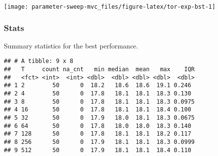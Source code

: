 \documentclass[]{book}
\newenvironment{Shaded}{\begin{snugshade}}{\end{snugshade}}
\newcommand{\DataTypeTok}[1]{\textcolor[rgb]{0.13,0.29,0.53}{#1}}
\newcommand{\KeywordTok}[1]{\textcolor[rgb]{0.13,0.29,0.53}{\textbf{#1}}}
\newcommand{\NormalTok}[1]{#1}
\newcommand{\OperatorTok}[1]{\textcolor[rgb]{0.81,0.36,0.00}{\textbf{#1}}}
\newcommand{\OtherTok}[1]{\textcolor[rgb]{0.56,0.35,0.01}{#1}}
\newcommand{\StringTok}[1]{\textcolor[rgb]{0.31,0.60,0.02}{#1}}
\begin{document}
\texttt{[image: parameter-sweep-mvc\_files/figure-latex/tor-exp-bst-1]}

\hypertarget{stats-10}{%
\subsubsection{Stats}\label{stats-10}}

Summary statistics for the best performance.

\begin{Shaded}
\end{Shaded}

\begin{verbatim}
## # A tibble: 9 x 8
##   T     count na_cnt   min median  mean   max    IQR
##   <fct> <int>  <int> <dbl>  <dbl> <dbl> <dbl>  <dbl>
## 1 2        50      0  18.2   18.6  18.6  19.1 0.246 
## 2 4        50      0  17.8   18.1  18.1  18.3 0.130 
## 3 8        50      0  17.8   18.1  18.1  18.3 0.0975
## 4 16       50      0  17.8   18.1  18.1  18.4 0.100 
## 5 32       50      0  17.9   18.0  18.1  18.3 0.0675
## 6 64       50      0  17.8   18.0  18.0  18.3 0.140 
## 7 128      50      0  17.8   18.1  18.1  18.2 0.117 
## 8 256      50      0  17.9   18.1  18.1  18.3 0.0999
## 9 512      50      0  17.9   18.1  18.1  18.4 0.110
\end{verbatim}
\end{document}
